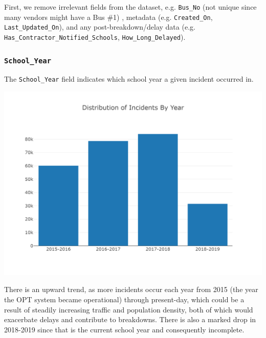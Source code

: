 \documentclass[11pt]{article}
\begin{document}
First, we remove irrelevant fields from the dataset, e.g. \texttt{Bus\_No} (not unique since many vendors might have a Bus \#1) , metadata (e.g. \texttt{Created\_On}, \texttt{Last\_Updated\_On}), and any post-breakdown/delay data (e.g. \texttt{Has\_Contractor\_Notified\_Schools}, \texttt{How\_Long\_Delayed}).

\subsubsection{\texttt{School\_Year}}
The \texttt{School\_Year} field indicates which school year a given incident occurred in.
\begin{center}
\includegraphics[width=5.25in]{images/school_year.png}
\end{center}
There is an upward trend, as more incidents occur each year from 2015 (the year the OPT system became operational) through present-day, which could be a result of steadily increasing traffic and population density, both of which would exacerbate delays and contribute to breakdowns. There is also a marked drop in 2018-2019 since that is the current school year and consequently incomplete.
\end{document}

